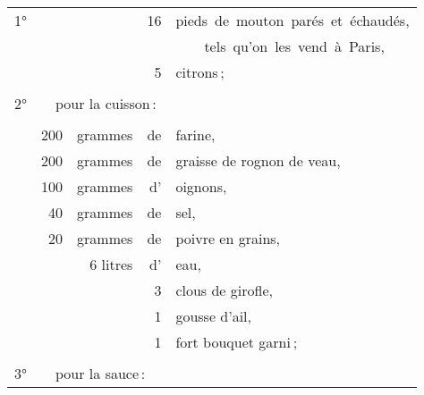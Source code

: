 \medskip

\footnotesize
\begin{tabular}{@{}lrrrp{18em}}
\normalsize1°\footnotesize & & & 16 & pieds de mouton parés et échaudés,                                  \\
  &     &          &    &     tels qu'on les vend à Paris,                                                \\
  &     &          &  5 & citrons ;                                                                       \\
  &     &          &    &                                                                                 \\
\normalsize 2° & \multicolumn{4}{l}{\normalsize   pour la cuisson :}                                      \\
\footnotesize
  &     &          &    &                                                                                 \\
  & 200 & grammes  & de & farine,                                                                         \\
  & 200 & grammes  & de & graisse de rognon de veau,                                                      \\
  & 100 & grammes  & d' & oignons,                                                                        \\
  &  40 & grammes  & de & sel,                                                                            \\
  &  20 & grammes  & de & poivre en grains,                                                               \\
  &     & 6 litres & d' & eau,                                                                            \\
  &     &          &  3 & clous de girofle,                                                               \\
  &     &          &  1 & gousse d'ail,                                                                   \\
  &     &          &  1 & fort bouquet garni ;                                                            \\
  &     &          &    &                                                                                 \\
\normalsize 3° & \multicolumn{4}{l}{\normalsize   pour la sauce :}                                        \\

\end{tabular}
